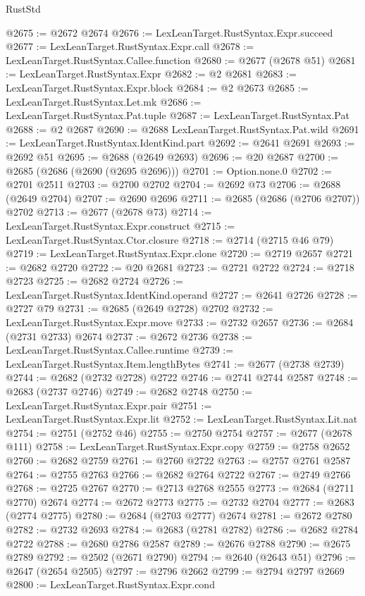 \begin{lexlean}{RustStd}
\begin{coremodule}
{\begin{coremodule}
{{{{{{{{{{{{{{{{{{{{{{{{{{@2675 := @2672 @2674
@2676 := LexLeanTarget.RustSyntax.Expr.succeed
@2677 := LexLeanTarget.RustSyntax.Expr.call
@2678 := LexLeanTarget.RustSyntax.Callee.function
@2680 := @2677 (@2678 @51)
@2681 := LexLeanTarget.RustSyntax.Expr
@2682 := @2 @2681
@2683 := LexLeanTarget.RustSyntax.Expr.block
@2684 := @2 @2673
@2685 := LexLeanTarget.RustSyntax.Let.mk
@2686 := LexLeanTarget.RustSyntax.Pat.tuple
@2687 := LexLeanTarget.RustSyntax.Pat
@2688 := @2 @2687
@2690 := @2688 LexLeanTarget.RustSyntax.Pat.wild
@2691 := LexLeanTarget.RustSyntax.IdentKind.part
@2692 := @2641 @2691
@2693 := @2692 @51
@2695 := @2688 (@2649 @2693)
@2696 := @20 @2687
@2700 := @2685 (@2686 (@2690 (@2695 @2696)))
@2701 := Option.none.{0}
@2702 := @2701 @2511
@2703 := @2700 @2702
@2704 := @2692 @73
@2706 := @2688 (@2649 @2704)
@2707 := @2690 @2696
@2711 := @2685 (@2686 (@2706 @2707)) @2702
@2713 := @2677 (@2678 @73)
@2714 := LexLeanTarget.RustSyntax.Expr.construct
@2715 := LexLeanTarget.RustSyntax.Ctor.closure
@2718 := @2714 (@2715 @46 @79)
@2719 := LexLeanTarget.RustSyntax.Expr.clone
@2720 := @2719 @2657
@2721 := @2682 @2720
@2722 := @20 @2681
@2723 := @2721 @2722
@2724 := @2718 @2723
@2725 := @2682 @2724
@2726 := LexLeanTarget.RustSyntax.IdentKind.operand
@2727 := @2641 @2726
@2728 := @2727 @79
@2731 := @2685 (@2649 @2728) @2702
@2732 := LexLeanTarget.RustSyntax.Expr.move
@2733 := @2732 @2657
@2736 := @2684 (@2731 @2733) @2674
@2737 := @2672 @2736
@2738 := LexLeanTarget.RustSyntax.Callee.runtime
@2739 := LexLeanTarget.RustSyntax.Item.lengthBytes
@2741 := @2677 (@2738 @2739)
@2744 := @2682 (@2732 @2728) @2722
@2746 := @2741 @2744 @2587
@2748 := @2683 (@2737 @2746)
@2749 := @2682 @2748
@2750 := LexLeanTarget.RustSyntax.Expr.pair
@2751 := LexLeanTarget.RustSyntax.Expr.lit
@2752 := LexLeanTarget.RustSyntax.Lit.nat
@2754 := @2751 (@2752 @46)
@2755 := @2750 @2754
@2757 := @2677 (@2678 @111)
@2758 := LexLeanTarget.RustSyntax.Expr.copy
@2759 := @2758 @2652
@2760 := @2682 @2759
@2761 := @2760 @2722
@2763 := @2757 @2761 @2587
@2764 := @2755 @2763
@2766 := @2682 @2764 @2722
@2767 := @2749 @2766
@2768 := @2725 @2767
@2770 := @2713 @2768 @2555
@2773 := @2684 (@2711 @2770) @2674
@2774 := @2672 @2773
@2775 := @2732 @2704
@2777 := @2683 (@2774 @2775)
@2780 := @2684 (@2703 @2777) @2674
@2781 := @2672 @2780
@2782 := @2732 @2693
@2784 := @2683 (@2781 @2782)
@2786 := @2682 @2784 @2722
@2788 := @2680 @2786 @2587
@2789 := @2676 @2788
@2790 := @2675 @2789
@2792 := @2502 (@2671 @2790)
@2794 := @2640 (@2643 @51)
@2796 := @2647 (@2654 @2505)
@2797 := @2796 @2662
@2799 := @2794 @2797 @2669
@2800 := LexLeanTarget.RustSyntax.Expr.cond
}}}}}}}}}}}}}}}}}}}}}}}}}}
\end{coremodule}}
\end{coremodule}
\end{lexlean}

